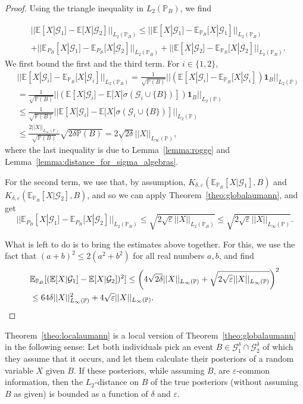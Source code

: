 \documentclass[a4paper, 10pt]{article}
\numberwithin{theorem}{section}
\theoremstyle{definition}
\newcommand{\E}{\mathbb{E}}
\newcommand{\G}{\mathcal{G}}
\newcommand{\ind}[1]{\mathbf{1}_{#1}}
\renewcommand{\epsilon}{\varepsilon}
\renewcommand{\P}{\mathbb{P}}
\begin{document}
\begin{proof}
	Using the triangle inequality in $L_2(\P_B)$, we find
	
	\begin{align*}
		& ||\E[X|\G_1]-\E[X|\G_2]||_{L_2(\P_B)} \leq ||\E[X|\G_1]-\E_{\P_B}[X|\G_1]||_{L_2(\P_B)} \\
		&+  ||\E_{P_B}[X|\G_1]-\E_{P_B}[X|\G_2]||_{L_2(\P_B)} +||\E[X|\G_2]-\E_{\P_B}[X|\G_2]||_{L_2(\P_B)}.
	\end{align*}
	We first bound the first and the third term. For $i \in \{1,2\}$,
	\begin{align*}
		&||\E[X|\G_i]-\E_{\P_B}[X|\G_i]||_{L_2(\P_B)} = \frac{1}{\sqrt{\P(B)}} ||(\E[X|\G_i]-\E_{\P_B}[X|\G_i]) \ind{B}||_{L_2(\P)} \\ 
		&=\frac{1}{\sqrt{\P(B)}} ||(\E[X|\G_i]-\E[X|\sigma(\G_i \cup \{B\})] ) \ind{B}||_{L_2(\P)} \\
		&\leq \frac{1}{\sqrt{\P(B)}} ||\E[X|\G_i]-\E[X|\sigma(\G_i \cup \{B\})]  ||_{L_2(\P)} \\
		&\leq \frac{2||X||_{L_\infty(\P)}}{\sqrt{\P(B)}} \sqrt{2\delta \P(B)}= 2\sqrt{2\delta}||X||_{L_\infty(\P)} ,
	\end{align*}
	where the last inequality is due to Lemma~\ref{lemma:rogge} and Lemma~\ref{lemma:distance_for_sigma_algebras}.
	
	For the second term, we use that, by assumption,  $K_{\delta,\epsilon}(\E_{\P_B}[X|\G_1], B)$ and $K_{\delta,\epsilon}(\E_{\P_B}[X|\G_2], B)$, and so we can apply Theorem~\ref{theo:globalaumann}, and get
	$$||\E_{P_B}[X|\G_1]-\E_{P_B}[X|\G_2]||_{L_2(\P_B)} \leq \sqrt{2\sqrt{\epsilon} ||X||_{L_2(\P_B)}} \leq \sqrt{2\sqrt{\epsilon} ||X||_{L_\infty(\P)}}. $$
	
	What is left to do is to bring the estimates above together. For this, we use the fact that $(a+b)^2 \leq 2(a^2+b^2)$ for all real numbers $a,b$, and find
	\begin{align*}
	&\E_{\P_B}[(\E[X|\G_1]-\E[X|\G_2])^2] \leq \left(4\sqrt{2\delta} ||X||_{L_\infty(\P)} +\sqrt{2\sqrt{\epsilon} ||X||_{L_\infty(\P)}}\right)^2 \\
	&\leq 64\delta ||X||_{L_\infty(\P)}^2 + 4 \sqrt{\epsilon}||X||_{L_\infty(\P)}.\qedhere
	\end{align*} 
\end{proof}

Theorem~\ref{theo:localaumann} is a local version of Theorem~\ref{theo:globalaumann} in the following sense: Let both individuals pick an event $B \in \G_1^\delta \cap \G_2^\delta$ of which they assume that it occurs, and let them calculate their posteriors of a random variable $X$ given $B$. If these posteriors, while assuming $B$, are $\epsilon$-common information, then the $L_2$-distance on $B$ of the true posteriors (without assuming $B$ as given) is bounded as a function of $\delta$ and $\epsilon$.
\end{document}
